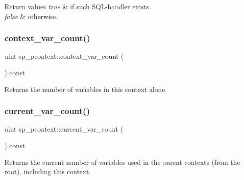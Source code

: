 \begin{DoxyRetVals}{Return values}
{\em true} & if such S\+QL-\/handler exists. \\
\hline
{\em false} & otherwise. \\
\hline
\end{DoxyRetVals}
\mbox{\label{classsp__pcontext_a2733cafaa598552f29d8780347040abc}} 
\subsubsection{\texorpdfstring{context\+\_\+var\+\_\+count()}{context\_var\_count()}}
{\footnotesize\ttfamily uint sp\+\_\+pcontext\+::context\+\_\+var\+\_\+count (\begin{DoxyParamCaption}{ }\end{DoxyParamCaption}) const\hspace{0.3cm}{\ttfamily [inline]}}

\begin{DoxyReturn}{Returns}
the number of variables in this context alone. 
\end{DoxyReturn}
\mbox{\label{classsp__pcontext_a368a6fdbad2b286956bd9e67cba15825}} 
\subsubsection{\texorpdfstring{current\+\_\+var\+\_\+count()}{current\_var\_count()}}
{\footnotesize\ttfamily uint sp\+\_\+pcontext\+::current\+\_\+var\+\_\+count (\begin{DoxyParamCaption}{ }\end{DoxyParamCaption}) const\hspace{0.3cm}{\ttfamily [inline]}}

\begin{DoxyReturn}{Returns}
the current number of variables used in the parent contexts (from the root), including this context. 
\end{DoxyReturn}
\mbox{\label{classsp__pcontext_a480a92643ee11341486f2ed2aec31593}} 
